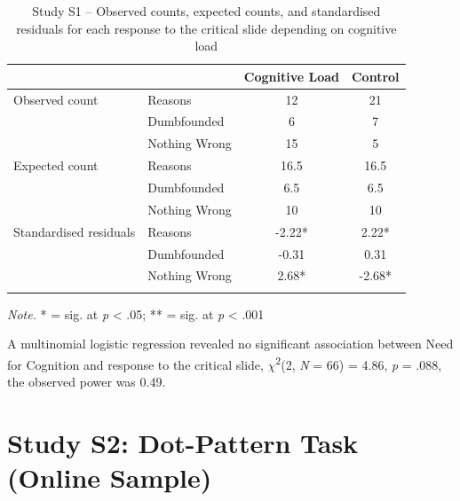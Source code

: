 \documentclass[
  man,floatsintext]{apa6}
\begin{document}
\begin{table}[tbp]

\begin{center}
\begin{threeparttable}

\caption{\label{tab:S1tab1dumb}Study S1 – Observed counts, expected counts, and standardised residuals for each response to the critical slide depending on cognitive load}

\begin{tabular}{llcc}
\toprule
 & \multicolumn{1}{c}{} & \multicolumn{1}{c}{Cognitive Load} & \multicolumn{1}{c}{Control}\\
\midrule
Observed count & Reasons & 12 & 21\\
 & Dumbfounded & 6 & 7\\
 & Nothing Wrong & 15 & 5\\
Expected count & Reasons & 16.5 & 16.5\\
 & Dumbfounded & 6.5 & 6.5\\
 & Nothing Wrong & 10 & 10\\
Standardised residuals & Reasons & -2.22* & 2.22*\\
 & Dumbfounded & -0.31 & 0.31\\
 & Nothing Wrong & 2.68* & -2.68*\\
\bottomrule
\addlinespace
\end{tabular}

\begin{tablenotes}[para]
\normalsize{\textit{Note.} * = sig. at \emph{p} < .05; ** = sig. at \emph{p} < .001}
\end{tablenotes}

\end{threeparttable}
\end{center}

\end{table}

A multinomial logistic regression revealed no significant association between Need for Cognition and response to the critical slide, \(\chi\)\textsuperscript{2}(2, \emph{N} = 66) = 4.86, \emph{p} = .088, the observed power was 0.49.

\newpage

\newpage

\hypertarget{study-s2-dot-pattern-task-online-sample}{%
\section{Study S2: Dot-Pattern Task (Online Sample)}\label{study-s2-dot-pattern-task-online-sample}}
\end{document}
